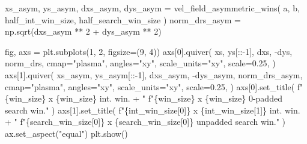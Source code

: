 \documentclass[
  english,
  letterpaper,
  numbers=noendperiod,
  DIV=13]{scrreprt}
\newenvironment{Shaded}{\begin{snugshade}}{\end{snugshade}}
\newcommand{\DecValTok}[1]{\textcolor[rgb]{0.68,0.00,0.00}{#1}}
\newcommand{\FloatTok}[1]{\textcolor[rgb]{0.68,0.00,0.00}{#1}}
\newcommand{\NormalTok}[1]{\textcolor[rgb]{0.00,0.23,0.31}{#1}}
\newcommand{\OperatorTok}[1]{\textcolor[rgb]{0.37,0.37,0.37}{#1}}
\newcommand{\SpecialCharTok}[1]{\textcolor[rgb]{0.37,0.37,0.37}{#1}}
\newcommand{\SpecialStringTok}[1]{\textcolor[rgb]{0.13,0.47,0.30}{#1}}
\newcommand{\StringTok}[1]{\textcolor[rgb]{0.13,0.47,0.30}{#1}}
\begin{document}
\begin{Shaded}
\begin{Highlighting}[]
\NormalTok{xs\_asym, ys\_asym, dxs\_asym, dys\_asym }\OperatorTok{=}\NormalTok{ vel\_field\_asymmetric\_wins(}
\NormalTok{    a, b, half\_int\_win\_size, half\_search\_win\_size}
\NormalTok{)}
\NormalTok{norm\_drs\_asym }\OperatorTok{=}\NormalTok{ np.sqrt(dxs\_asym }\OperatorTok{**} \DecValTok{2} \OperatorTok{+}\NormalTok{ dys\_asym }\OperatorTok{**} \DecValTok{2}\NormalTok{)}

\NormalTok{fig, axs }\OperatorTok{=}\NormalTok{ plt.subplots(}\DecValTok{1}\NormalTok{, }\DecValTok{2}\NormalTok{, figsize}\OperatorTok{=}\NormalTok{(}\DecValTok{9}\NormalTok{, }\DecValTok{4}\NormalTok{))}
\NormalTok{axs[}\DecValTok{0}\NormalTok{].quiver(}
\NormalTok{    xs,}
\NormalTok{    ys[::}\OperatorTok{{-}}\DecValTok{1}\NormalTok{],}
\NormalTok{    dxs,}
    \OperatorTok{{-}}\NormalTok{dys,}
\NormalTok{    norm\_drs,}
\NormalTok{    cmap}\OperatorTok{=}\StringTok{"plasma"}\NormalTok{,}
\NormalTok{    angles}\OperatorTok{=}\StringTok{"xy"}\NormalTok{,}
\NormalTok{    scale\_units}\OperatorTok{=}\StringTok{"xy"}\NormalTok{,}
\NormalTok{    scale}\OperatorTok{=}\FloatTok{0.25}\NormalTok{,}
\NormalTok{)}
\NormalTok{axs[}\DecValTok{1}\NormalTok{].quiver(}
\NormalTok{    xs\_asym,}
\NormalTok{    ys\_asym[::}\OperatorTok{{-}}\DecValTok{1}\NormalTok{],}
\NormalTok{    dxs\_asym,}
    \OperatorTok{{-}}\NormalTok{dys\_asym,}
\NormalTok{    norm\_drs\_asym,}
\NormalTok{    cmap}\OperatorTok{=}\StringTok{"plasma"}\NormalTok{,}
\NormalTok{    angles}\OperatorTok{=}\StringTok{"xy"}\NormalTok{,}
\NormalTok{    scale\_units}\OperatorTok{=}\StringTok{"xy"}\NormalTok{,}
\NormalTok{    scale}\OperatorTok{=}\FloatTok{0.25}\NormalTok{,}
\NormalTok{)}
\NormalTok{axs[}\DecValTok{0}\NormalTok{].set\_title(}
    \SpecialStringTok{f"}\SpecialCharTok{\{}\NormalTok{win\_size}\SpecialCharTok{\}}\SpecialStringTok{ x }\SpecialCharTok{\{}\NormalTok{win\_size}\SpecialCharTok{\}}\SpecialStringTok{ int. win. + "}
    \SpecialStringTok{f"}\SpecialCharTok{\{}\NormalTok{win\_size}\SpecialCharTok{\}}\SpecialStringTok{ x }\SpecialCharTok{\{}\NormalTok{win\_size}\SpecialCharTok{\}}\SpecialStringTok{ 0{-}padded search win."}
\NormalTok{)}
\NormalTok{axs[}\DecValTok{1}\NormalTok{].set\_title(}
    \SpecialStringTok{f"}\SpecialCharTok{\{}\NormalTok{int\_win\_size[}\DecValTok{0}\NormalTok{]}\SpecialCharTok{\}}\SpecialStringTok{ x }\SpecialCharTok{\{}\NormalTok{int\_win\_size[}\DecValTok{1}\NormalTok{]}\SpecialCharTok{\}}\SpecialStringTok{ int. win. + "}
    \SpecialStringTok{f"}\SpecialCharTok{\{}\NormalTok{search\_win\_size[}\DecValTok{0}\NormalTok{]}\SpecialCharTok{\}}\SpecialStringTok{ x }\SpecialCharTok{\{}\NormalTok{search\_win\_size[}\DecValTok{0}\NormalTok{]}\SpecialCharTok{\}}\SpecialStringTok{ unpadded search win."}
\NormalTok{)}
\NormalTok{ax.set\_aspect(}\StringTok{"equal"}\NormalTok{)}
\NormalTok{plt.show()}
\end{Highlighting}
\end{Shaded}
\end{document}

